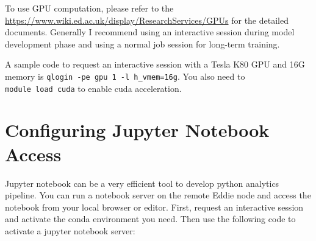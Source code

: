 \documentclass[
]{book}
\begin{document}
To use GPU computation, please refer to the \url{https://www.wiki.ed.ac.uk/display/ResearchServices/GPUs} for the detailed documents. Generally I recommend using an interactive session during model development phase and using a normal job session for long-term training.

A sample code to request an interactive session with a Tesla K80 GPU and 16G memory is \texttt{qlogin\ -pe\ gpu\ 1\ -l\ h\_vmem=16g}. You also need to \texttt{module\ load\ cuda} to enable cuda acceleration.

\hypertarget{configuring-jupyter-notebook-access}{%
\section{Configuring Jupyter Notebook Access}\label{configuring-jupyter-notebook-access}}

Jupyter notebook can be a very efficient tool to develop python analytics pipeline. You can run a notebook server on the remote Eddie node and access the notebook from your local browser or editor. First, request an interactive session and activate the conda environment you need. Then use the following code to activate a jupyter notebook server:
\end{document}
